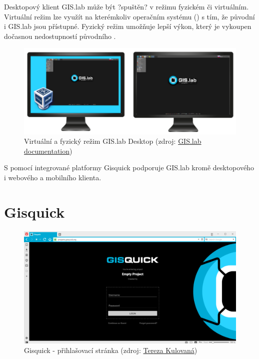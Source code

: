 Desktopový klient GIS.lab může být ?spuštěn? v režimu fyzickém či virtuálním. Virtuální režim lze využít na kterémkoliv operačním systému () s tím, že původní  i GIS.lab jsou přístupné. Fyzický režim umožňuje lepší výkon, který je vykoupen dočasnou nedostupností původního .

\begin{figure}[H] \centering
    \includegraphics[width=450pt]{./pictures/physical-or-virtual-mode.png}
    \caption[Virtuální a fyzický režim GIS.lab Desktop]{Virtuální a fyzický režim GIS.lab Desktop (zdroj:
	\href{https://gislab.readthedocs.io/en/latest/_images/physical-or-virtual-mode.png}{GIS.lab documentation})}
	\label{fig:gislab-rezim}
\end{figure}

S pomocí integrované platformy Gisquick podporuje GIS.lab kromě desktopového i webového a mobilního klienta. 

\section{Gisquick}

\begin{figure}[H] \centering
    \includegraphics[width=400pt]{./pictures/gisquick-welcome-screen.png}
    \caption[Gisquick - přihlašovací stránka]{Gisquick - přihlašovací stránka (zdroj:
	\href{}{Tereza Kulovaná})}
    \label{fig:gisquick-welcome}
\end{figure}

